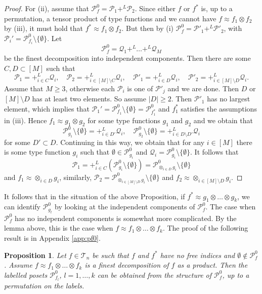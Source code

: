 \documentclass[12pt]{article}
\newtheorem{prop}{Proposition}
\theoremstyle{definition}
\theoremstyle{remark}
\def\Indep{+^L}
\def\indep{+^L}
\def\Te{\mathcal T}
\def\Pe{\mathcal P}
\begin{document}
\begin{proof}
For (ii), assume that $\Pe_f^0=\Pe_1\indep \Pe_2$. Since either $f$ or $f^*$ is, up to a
permutation, a tensor
product of type functions and we cannot have $f\approx f_1\otimes f_2$ by (iii), 
 it must hold that $f^*\approx f_1\otimes f_2$. But then by (i) $\Pe_f^0=\Pe'_1\indep \Pe'_2$, with 
$\Pe_i'=\Pe^0_{f_i}\setminus \{\emptyset\}$. Let 
\[
\Pe_f^0=\mathcal Q_1\indep \dots \indep  \mathcal Q_M
\]
be the finest decomposition into independent components. Then there are some $C,D\subset [M]$
such that 
\[
\Pe_1=\Indep_{i\in C} \mathcal Q_i,\quad  \Pe_2=\Indep_{i\in [M]\setminus C} \mathcal
Q_i, \quad \Pe'_1=\Indep_{i\in D} \mathcal Q_i,\quad  \Pe'_2=\Indep_{i\in [M]\setminus D}
\mathcal Q_i.
\]
Assume that $M\ge 3$, otherwise each $\Pe_i$ is one of $\Pe'_j$ and we are done. 
Then $D$ or $[M]\setminus D$ has at least two elements. So assume $|D|\ge 2$. Then $\Pe'_1$ has no largest
 element, which implies that $\Pe_1'=\Pe_{f_1}^0\setminus\{\emptyset\}=\Pe_{f_1^*}^0$ and $f_1^*$ satisfies the assumptions
 in (iii). Hence $f_1\approx g_1\otimes g_2$ for some type functions $g_1$ and $g_2$ and we
 obtain that 
 \[
\Pe_{g_1}^0\setminus \{\emptyset\} = +_{i\in D'}^L \mathcal Q_i,\quad \Pe_{g_2}^0\setminus
\{\emptyset\} = +_{i\in D\setminus D'}^L\mathcal Q_i
 \]
for some $D'\subset D$. Continuing in this way, we obtain that for any $i\in [M]$ there is
some type function $g_i$ such that $\emptyset \in \Pe_{g_i}^0$ and $\mathcal
Q_i=\Pe_{g_i}^0\setminus \{\emptyset\}$. It follows that 
\[
\Pe_1=+^L_{i\in C}(\Pe_{g_i}^0\setminus \{\emptyset\})=\Pe^0_{\otimes_{i\in
D}g_i}\setminus\{\emptyset\}
\]
and $f_1\approx \otimes_{i\in D}g_i$, similarly, $\Pe_2=\Pe^0_{\otimes_{i\in
[M]\setminus D}g_i}\setminus\{\emptyset\}$ and $f_2\approx\otimes_{i\in [M]\setminus
D}g_i$. 


\end{proof}

It follows that in the situation of the above Proposition, if $f^*\approx g_1\otimes
\dots\otimes g_k$, we can identify $\Pe_{g_l}^0$  by looking at the independent
components of $\Pe_f^0$. The case when $\Pe_f^0$ has no independent components is somewhat more complicated.
 By the lemma above, this
is the case when $f\approx f_1\otimes\dots\otimes f_k$. The proof of the following result is in Appendix \ref{app:pf0}.

\begin{prop}\label{prop:nofree_product}  Let $f\in \Te_n$ be such that $f$ and $f^*$ have
no free indices and $\emptyset\notin \Pe_f^0$. Assume $f\approx f_1\otimes
\dots\otimes f_k$ is a finest decomposition of $f$ as a product.  Then the labelled posets
$\Pe_{f_l}^0$, $l=1,\dots,k$ can be obtained from the structure of $\Pe_f^0$, up to a
permutation on the labels.

\end{prop}
\end{document}

